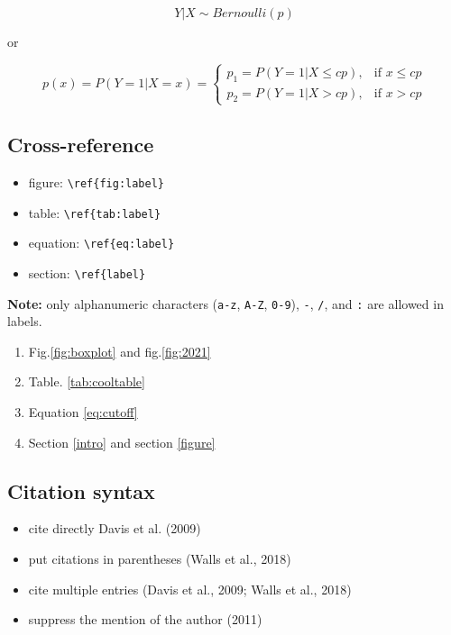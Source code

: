 \documentclass[]{elsarticle} %
\providecommand{\tightlist}{%
  \setlength{\itemsep}{0pt}\setlength{\parskip}{0pt}}
\begin{document}
\[Y|X \sim Bernoulli(p)\]

or

\begin{equation}
\label{eq:cutoff}
p(x) = P(Y = 1|X = x) = 
\left\{
    \begin{array}{lr}
          p_1 = P(Y = 1|X \le cp), & \text{if } x \le cp\\
          p_2 = P(Y = 1|X > cp), & \text{if } x > cp
    \end{array}
\right.
\end{equation}

\subsection{Cross-reference}\label{cross-reference}

\begin{itemize}
\tightlist
\item
  figure: \texttt{\textbackslash{}ref\{fig:label\}}
\item
  table: \texttt{\textbackslash{}ref\{tab:label\}}
\item
  equation: \texttt{\textbackslash{}ref\{eq:label\}}
\item
  section: \texttt{\textbackslash{}ref\{label\}}
\end{itemize}

\textbf{Note:} only alphanumeric characters (\texttt{a-z}, \texttt{A-Z},
\texttt{0-9}), \texttt{-}, \texttt{/}, and \texttt{:} are allowed in
labels.

\begin{enumerate}
\def\labelenumi{\arabic{enumi}.}
\tightlist
\item
  Fig.\ref{fig:boxplot} and fig.\ref{fig:2021}
\item
  Table. \ref{tab:cooltable}
\item
  Equation \ref{eq:cutoff}
\item
  Section \ref{intro} and section \ref{figure}
\end{enumerate}

\subsection{Citation syntax}\label{citation-syntax}

\begin{itemize}
\tightlist
\item
  cite directly Davis et al. (2009)
\item
  put citations in parentheses (Walls et al., 2018)
\item
  cite multiple entries (Davis et al., 2009; Walls et al., 2018)
\item
  suppress the mention of the author (2011)
\end{itemize}
\end{document}
